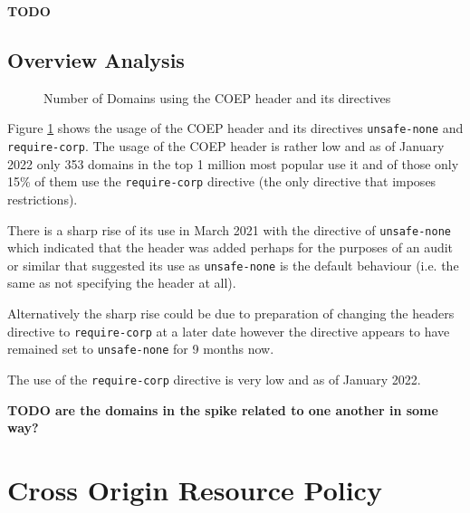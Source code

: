 \documentclass{mscreport}
\begin{document}
\textbf{TODO}

\subsection{Overview Analysis}

\begin{figure}[H]
	\begin{center}
		\caption{Number of Domains using the COEP header and its directives}
		\label{fig:coep_overview}
	\end{center}
\end{figure}

\noindent
Figure \ref{fig:coep_overview} shows the usage of the COEP header and its directives \texttt{unsafe-none} and \texttt{require-corp}. The usage of the COEP header is rather low and as of January 2022 only 353 domains in the top 1 million most popular use it and of those only 15\% of them use the \texttt{require-corp} directive (the only directive that imposes restrictions).

\vspace{0.3cm} \noindent
There is a sharp rise of its use in March 2021 with the directive of \texttt{unsafe-none} which indicated that the header was added perhaps for the purposes of an audit or similar that suggested its use as \texttt{unsafe-none} is the default behaviour (i.e. the same as not specifying the header at all).

\vspace{0.3cm} \noindent
Alternatively the sharp rise could be due to preparation of changing the headers directive to \texttt{require-corp} at a later date however the directive appears to have remained set to \texttt{unsafe-none} for 9 months now.

\vspace{0.3cm} \noindent
The use of the \texttt{require-corp} directive is very low and as of January 2022.

\vspace{0.3cm} \noindent
\textbf{TODO are the domains in the spike related to one another in some way?}

\clearpage
\newpage


\section{Cross Origin Resource Policy}
\label{section:corp}
\end{document}
